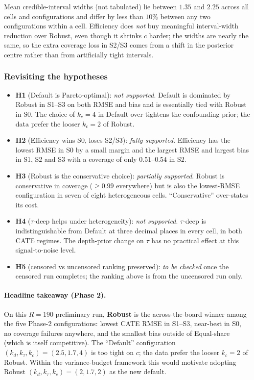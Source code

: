 \documentclass[11pt]{article}
\theoremstyle{plain}
\theoremstyle{definition}
\theoremstyle{remark}
\newcommand{\1}{\mathds{1}}
\begin{document}
Mean credible-interval widths (not tabulated) lie between $1.35$ and
$2.25$ across all cells and configurations and differ by less than
$10\%$ between any two configurations within a cell. Efficiency does
\emph{not} buy meaningful interval-width reduction over Robust, even
though it shrinks $c$ harder; the widths are nearly the same, so the
extra coverage loss in S2/S3 comes from a shift in the posterior centre
rather than from artificially tight intervals.

\subsubsection*{Revisiting the hypotheses}

\begin{itemize}
  \item \textbf{H1} (Default is Pareto-optimal): \emph{not supported}.
    Default is dominated by Robust in S1--S3 on both RMSE and bias and
    is essentially tied with Robust in S0. The choice of $k_c = 4$ in
    Default over-tightens the confounding prior; the data prefer the
    looser $k_c = 2$ of Robust.
  \item \textbf{H2} (Efficiency wins S0, loses S2/S3):
    \emph{fully supported}. Efficiency has the lowest RMSE in S0 by a
    small margin and the largest RMSE and largest bias in S1, S2 and S3
    with a coverage of only $0.51$--$0.54$ in S2.
  \item \textbf{H3} (Robust is the conservative choice):
    \emph{partially supported}. Robust is conservative in coverage
    ($\geq 0.99$ everywhere) but is also the lowest-RMSE configuration
    in seven of eight heterogeneous cells. ``Conservative'' over-states
    its cost.
  \item \textbf{H4} ($\tau$-deep helps under heterogeneity):
    \emph{not supported}. $\tau$-deep is indistinguishable from
    Default at three decimal places in every cell, in both CATE
    regimes. The depth-prior change on $\tau$ has no practical effect
    at this signal-to-noise level.
  \item \textbf{H5} (censored vs uncensored ranking preserved):
    \emph{to be checked} once the censored run completes; the ranking
    above is from the uncensored run only.
\end{itemize}

\paragraph{Headline takeaway (Phase 2).}
On this $R = 190$ preliminary run, \textbf{Robust} is the across-the-board
winner among the five Phase-2 configurations: lowest CATE RMSE in S1--S3,
near-best in S0, no coverage failures anywhere, and the smallest bias
outside of Equal-share (which is itself competitive).
The ``Default'' configuration $(k_d, k_\tau, k_c) = (2.5, 1.7, 4)$ is too
tight on $c$; the data prefer the looser $k_c = 2$ of Robust.
Within the variance-budget framework this would motivate adopting Robust
$(k_d, k_\tau, k_c) = (2, 1.7, 2)$ as the new default.
\end{document}
